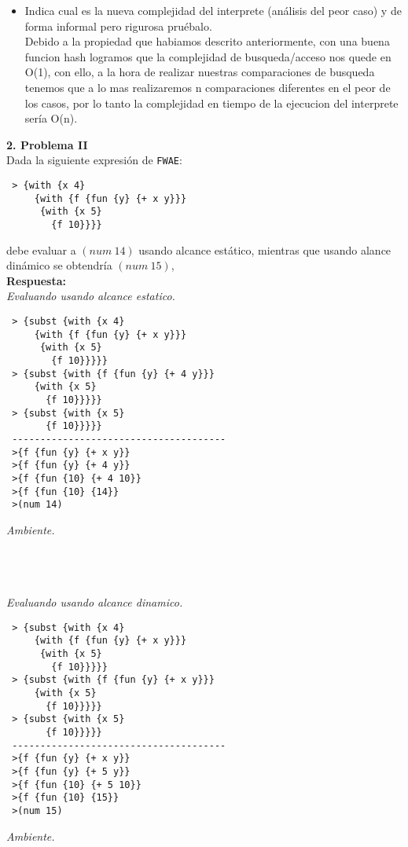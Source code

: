 \documentclass[letterpaper,11pt]{article}
\begin{document}
\begin{itemize}
\begin{verbatim}
     \end{verbatim}
    
 
 \item Indica cual es la nueva complejidad del interprete (análisis del peor caso) y de forma informal pero rigurosa pruébalo.
  \\
  Debido a la propiedad que habiamos descrito anteriormente, con una buena funcion hash logramos que la complejidad de busqueda/acceso nos quede en O(1), con ello, a la hora de realizar nuestras comparaciones de busqueda
  tenemos que a lo mas realizaremos n comparaciones diferentes en el peor de los casos, por lo tanto la complejidad en tiempo de la ejecucion  del interprete sería O(n).
  
 
 
 
 \end{itemize}
 
 {\bf 2. Problema II}
 \\
 Dada la siguiente expresión de \texttt{FWAE}:
 \begin{verbatim}
 > {with {x 4}
     {with {f {fun {y} {+ x y}}}
      {with {x 5}
        {f 10}}}}
 \end{verbatim}
 debe evaluar a $(num\ 14)$ usando alcance estático, mientras que usando alance  dinámico se obtendría $(num\ 15)$, 
 \\
\textbf{Respuesta:} 
\\
\textit{Evaluando usando alcance estatico.}
 \begin{verbatim}
 > {subst {with {x 4}
     {with {f {fun {y} {+ x y}}}
      {with {x 5}
        {f 10}}}}}
 > {subst {with {f {fun {y} {+ 4 y}}}
     {with {x 5}
       {f 10}}}}}
 > {subst {with {x 5}
       {f 10}}}}}
 --------------------------------------
 >{f {fun {y} {+ x y}}
 >{f {fun {y} {+ 4 y}}
 >{f {fun {10} {+ 4 10}}
 >{f {fun {10} {14}}
 >(num 14) 
 \end{verbatim}
\textit{Ambiente.}
\\
\\
\\
\\
\textit{Evaluando usando alcance dinamico.}
 \begin{verbatim}
 > {subst {with {x 4}
     {with {f {fun {y} {+ x y}}}
      {with {x 5}
        {f 10}}}}}
 > {subst {with {f {fun {y} {+ x y}}}
     {with {x 5}
       {f 10}}}}}
 > {subst {with {x 5}
       {f 10}}}}}
 --------------------------------------
 >{f {fun {y} {+ x y}}
 >{f {fun {y} {+ 5 y}}
 >{f {fun {10} {+ 5 10}}
 >{f {fun {10} {15}}
 >(num 15) 
 \end{verbatim}
\textit{Ambiente.}
\\
\\
\\
\end{document}

